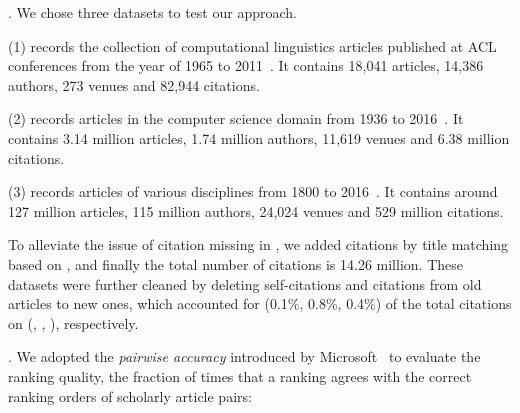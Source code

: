 . We chose three datasets to test our approach.

\noindent
(1) \aan records the collection of computational linguistics articles published at ACL conferences from the year of 1965 to 2011~\cite{Liang16AAAI}.
It contains 18,041 articles, 14,386 authors, 273 venues and 82,944 citations.

\noindent
(2) \aminer records articles in the computer science domain from 1936 to 2016~\cite{Tang:08KDD}.
It contains 3.14 million articles, 1.74 million authors, 11,619 venues and 6.38 million citations.

\noindent
(3) \magdata records articles of various disciplines from 1800 to 2016~\cite{Sinha15:MAG}.
It contains around 127 million articles, 115 million authors, 24,024 venues and 529 million citations.

To alleviate the issue of citation missing in \aminer, we added citations by title matching  based on \magdata, and finally the  total number of citations is 14.26 million. These datasets were further cleaned by deleting self-citations and citations from old articles to new ones, which accounted for (0.1\%, 0.8\%, 0.4\%) of the total citations on (\aan, \aminer, \magdata), respectively.





.
We adopted the {\em pairwise accuracy} introduced by Microsoft~\cite{Richardson06:BPR,wsdmcup} to evaluate the ranking quality, \ie the fraction of times that a ranking agrees with the correct ranking orders of scholarly article pairs:


